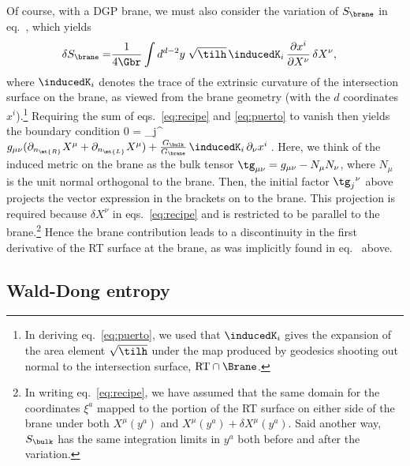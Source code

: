 Of course, with a DGP brane, we must also consider the variation of $S_\brane$ in eq.~, which yields
\begin{align}
  \delta S_\brane
  =& \frac{1}{4\Gbr}
  \int d^{d-2}y\; \sqrt{\tilh}\,
  \inducedK_i \,\frac{\partial x^i}{\partial X^\nu}\, \delta X^\nu,
  \label{eq:puerto}
\end{align}
where $\inducedK_i$ denotes the trace of the extrinsic curvature of the intersection surface on the brane, as viewed from the brane geometry (with the $d$ coordinates $x^i$).\footnote{In deriving eq.~\eqref{eq:puerto}, we used that $\inducedK_i$ gives the expansion of the area element $\sqrt{\tilh}$ under the map produced by geodesics shooting out normal to the intersection surface, ${\rm RT}\cap\Brane$. }
Requiring the sum of eqs.~\eqref{eq:recipe} and \eqref{eq:puerto} to vanish then yields the boundary condition
\beq\label{ortho7}
 0  =  \tg_j{}^\nu\(g_{\mu\nu} (\partial_{n_\mt{R}} X^\mu+\partial_{n_\mt{L}}X^\mu)
  + \frac{G_\bulk}{G_\brane}\,\inducedK_i \,\partial_\nu x^i\)\,.
\eeq
Here, we think of the induced metric on the brane as the bulk tensor $\tg_{\mu\nu}=g_{\mu\nu}-N_\mu N_\nu$, where $N_\mu$ is the unit normal orthogonal to the brane. Then, the initial factor $\tg_j{}^\nu$ above projects the vector expression in the brackets on to the brane. This projection is required because  $\delta X^\nu$ in eqs.~\eqref{eq:recipe} and  is restricted to be parallel to the brane.\footnote{In writing eq.~\eqref{eq:recipe}, we have assumed that the same domain for the coordinates $\xi^a$ mapped to the portion of the RT surface on either side of the brane under both $X^\mu(y^a)$ and $X^\mu(y^a)+\delta X^\mu(y^a)$. Said another way, $S_\bulk$ has the same integration limits in $y^a$ both before and after the variation.}
Hence the brane contribution  leads to a discontinuity in the first derivative of the RT surface at the brane, as was implicitly found in eq.~ above.


\subsection{Wald-Dong entropy} \label{sec:genera}

